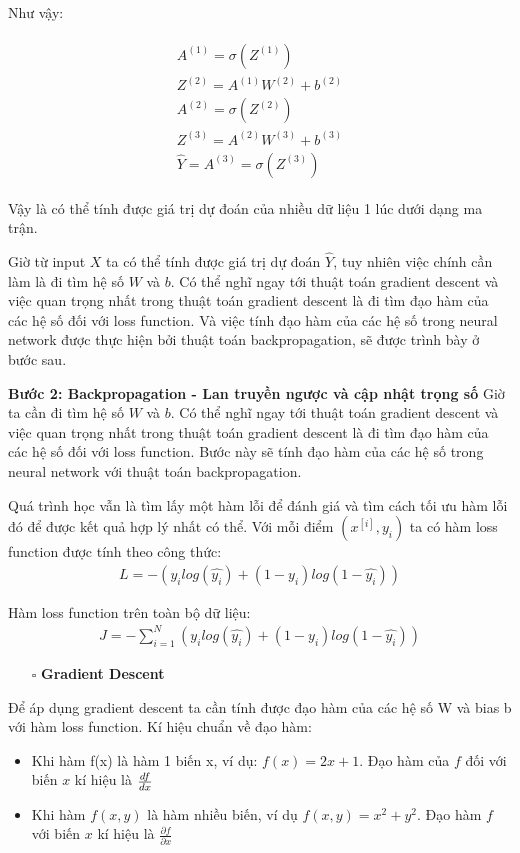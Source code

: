 Như vậy:

\begin{align}
\begin{split}
A^{(1)} =  \sigma (Z^{(1)}) \\
Z^{(2)} = A^{(1)}W^{(2)} + b^{(2)} \\
A^{(2)} =  \sigma (Z^{(2)}) \\
Z^{(3)} = A^{(2)}W^{(3)} + b^{(3)} \\
\hat{Y} = A^{(3)} =  \sigma (Z^{(3)})
\end{split}
\end{align}

Vậy là có thể tính được giá trị dự đoán của nhiều dữ liệu 1 lúc dưới dạng ma trận.

Giờ từ input $X$ ta có thể tính được giá trị dự đoán $\hat{Y}$, tuy nhiên việc chính cần làm là đi tìm hệ số $W$ và $b$. Có thể nghĩ ngay tới thuật toán gradient descent và việc quan trọng nhất trong thuật toán gradient descent là đi tìm đạo hàm của các hệ số đối với loss function. Và việc tính đạo hàm của các hệ số trong neural network được thực hiện bởi thuật toán backpropagation, sẽ được trình bày ở bước sau.

\textbf{Bước 2: Backpropagation - Lan truyền ngược và cập nhật trọng số}
Giờ ta cần đi tìm hệ số $W$ và $b$. Có thể nghĩ ngay tới thuật toán gradient descent và việc quan trọng nhất trong thuật toán gradient descent là đi tìm đạo hàm của các hệ số đối với loss function. Bước này sẽ tính đạo hàm của các hệ số trong neural network với thuật toán backpropagation.

Quá trình học vẫn là tìm lấy một hàm lỗi để đánh giá và tìm cách tối ưu hàm lỗi đó để được kết quả hợp lý nhất có thể. Với mỗi điểm $(x^{[i]}, y_i)$ ta có hàm loss function được tính theo công thức: 
\begin{align}
L = -(y_i  log(\hat{y_i}) + (1 - y_i)  log(1 - \hat{y_i}))
\end{align}

Hàm loss function trên toàn bộ dữ liệu:
\begin{align}
J = - \sum_{i=1}^{N}(y_i  log(\hat{y_i}) + (1 - y_i)  log(1 - \hat{y_i}))
\end{align}

\begin{itemize}
\item[$\square$] \textbf{Gradient Descent}
\end{itemize}
Để áp dụng gradient descent ta cần tính được đạo hàm của các hệ số W và bias b với hàm loss function.
Kí hiệu chuẩn về đạo hàm:
\begin{itemize}
\item Khi hàm f(x) là hàm 1 biến x, ví dụ: $ f(x) = 2x + 1$. Đạo hàm của $f$ đối với biến $x$ kí hiệu là $\frac{df}{dx}\newline $
\item Khi hàm $f(x, y)$ là hàm nhiều biến, ví dụ $ f(x, y) = x^2 + y^2$. Đạo hàm $f$ với biến $x$ kí hiệu là $ \frac{\partial f}{\partial x}$
\end{itemize}

